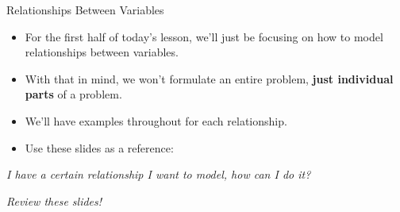 \documentclass[10pt, aspectratio=169]{beamer}
\begin{document}
\begin{frame}{Relationships Between Variables}
    \begin{itemize}
        \item For the first half of today's lesson, we'll just be focusing on how to model relationships between variables.
        \item With that in mind, we won't formulate an entire problem, \textbf{just individual parts} of a problem.
        \item We'll have examples throughout for each relationship.
        \item Use these slides as a reference:
    \end{itemize}
    \begin{center}
        \textit{I have a certain relationship I want to model, how can I do it?}

        \textit{Review these slides!}
    \end{center}
\end{frame}
\end{document}

